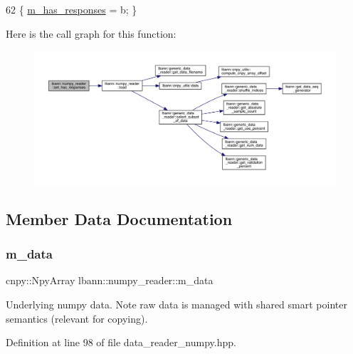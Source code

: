 \begin{DoxyCode}
62 \{ \hyperlink{classlbann_1_1numpy__reader_a7567338be86dff81afece19d031a942d}{m\_has\_responses} = b; \}
\end{DoxyCode}
Here is the call graph for this function\+:\nopagebreak
\begin{figure}[H]
\begin{center}
\leavevmode
\includegraphics[width=350pt]{classlbann_1_1numpy__reader_a511981e78b175345b6b8a84b5f688774_cgraph}
\end{center}
\end{figure}


\subsection{Member Data Documentation}
\mbox{\label{classlbann_1_1numpy__reader_a6d43a1eae0fedb6fa237b24cef8f37fa}} 
\subsubsection{\texorpdfstring{m\+\_\+data}{m\_data}}
{\footnotesize\ttfamily cnpy\+::\+Npy\+Array lbann\+::numpy\+\_\+reader\+::m\+\_\+data\hspace{0.3cm}{\ttfamily [protected]}}

Underlying numpy data. Note raw data is managed with shared smart pointer semantics (relevant for copying). 

Definition at line 98 of file data\+\_\+reader\+\_\+numpy.\+hpp.

\mbox{\label{classlbann_1_1numpy__reader_a0e8caa5609e706bf909b78c4c35377b8}} 
